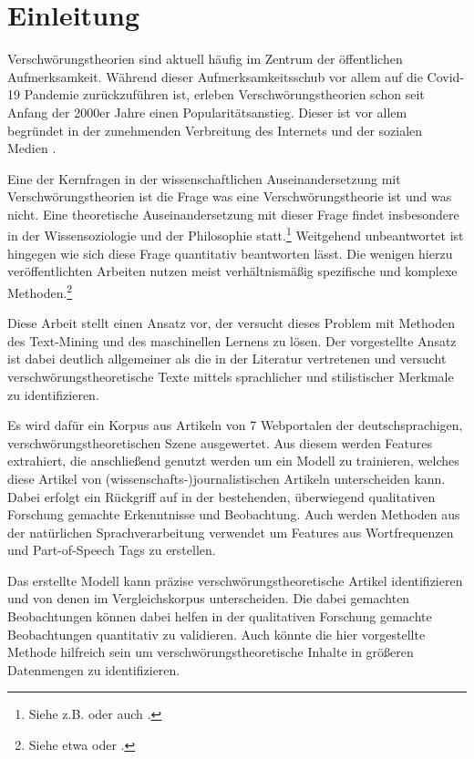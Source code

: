 \section{Einleitung}

Verschwörungstheorien sind aktuell häufig im Zentrum der öffentlichen Aufmerksamkeit.
Während dieser Aufmerksamkeitsschub vor allem auf die Covid-19 Pandemie zurückzuführen ist, erleben Verschwörungstheorien schon seit Anfang der 2000er Jahre einen Popularitätsanstieg.
Dieser ist vor allem begründet in der zunehmenden Verbreitung des Internets und der sozialen Medien \parencite[vgl.][492]{stano_2020}.

Eine der Kernfragen in der wissenschaftlichen Auseinandersetzung mit Verschwörungstheorien ist die Frage was eine Verschwörungstheorie ist und was nicht.
Eine theoretische Auseinandersetzung mit dieser Frage findet insbesondere in der Wissensoziologie und der Philosophie statt.\footnote{Siehe z.B. \textcite[]{coady_2006} oder auch \textcite{uscinski_2014}.}
Weitgehend unbeantwortet ist hingegen wie sich diese Frage quantitativ beantworten lässt.
Die wenigen hierzu veröffentlichten Arbeiten nutzen meist verhältnismäßig spezifische und komplexe Methoden.\footnote{Siehe etwa \textcite[]{samory_2018} oder \textcite[]{shahsavari_2020}.}

Diese Arbeit stellt einen Ansatz vor, der versucht dieses Problem mit Methoden des Text-Mining und des maschinellen Lernens zu lösen.
Der vorgestellte Ansatz ist dabei deutlich allgemeiner als die in der Literatur vertretenen und versucht verschwörungstheoretische Texte mittels sprachlicher und stilistischer Merkmale zu identifizieren.

Es wird dafür ein Korpus aus Artikeln von 7 Webportalen der deutschsprachigen, verschwörungstheoretischen Szene ausgewertet. 
Aus diesem werden Features extrahiert, die anschließend genutzt werden um ein Modell zu trainieren, welches diese Artikel von (wissenschafts-)journalistischen Artikeln unterscheiden kann.
Dabei erfolgt ein Rückgriff auf in der bestehenden, überwiegend qualitativen Forschung gemachte Erkenntnisse und Beobachtung.
Auch werden Methoden aus der natürlichen Sprachverarbeitung verwendet um Features aus Wortfrequenzen und Part-of-Speech Tags zu erstellen.

Das erstellte Modell kann präzise verschwörungstheoretische Artikel identifizieren und von denen im Vergleichskorpus unterscheiden.
Die dabei gemachten Beobachtungen können dabei helfen in der qualitativen Forschung gemachte Beobachtungen quantitativ zu validieren.
Auch könnte die hier vorgestellte Methode hilfreich sein um verschwörungstheoretische Inhalte in größeren Datenmengen zu identifizieren.